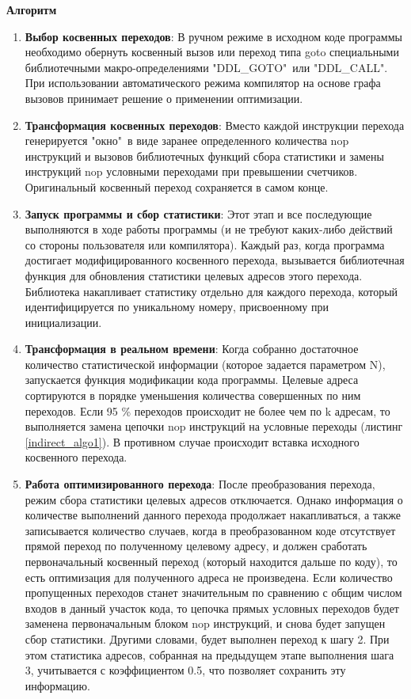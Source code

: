 \textbf{Алгоритм}
 \begin{enumerate}
 	\item \textbf{Выбор косвенных переходов}: В ручном режиме в исходном коде программы  необходимо обернуть косвенный вызов или переход типа goto специальными библиотечными макро-определениями "DDL\_GOTO"\  или "DDL\_CALL". При использовании автоматического режима компилятор на основе графа вызовов принимает решение о применении оптимизации. 
 	\item \textbf{Трансформация косвенных переходов}: Вместо каждой инструкции перехода генерируется "окно"\  в виде заранее определенного количества nop инструкций и вызовов библиотечных функций сбора статистики и замены инструкций nop условными переходами при превышении счетчиков. Оригинальный косвенный переход сохраняется в самом конце.
 	\item \textbf{Запуск программы и сбор статистики}: Этот этап и все последующие  выполняются в ходе работы программы (и не требуют каких-либо действий со стороны пользователя или компилятора). Каждый раз, когда программа достигает модифицированного косвенного перехода, вызывается библиотечная функция для обновления статистики целевых адресов этого перехода. Библиотека  накапливает статистику отдельно для каждого перехода, который идентифицируется по уникальному номеру, присвоенному при инициализации.
 	\item \textbf{Трансформация в реальном времени}: Когда собранно достаточное количество статистической информации (которое задается параметром N), запускается функция модификации кода программы. Целевые адреса сортируются в порядке уменьшения количества совершенных по ним переходов. Если 95 \% переходов происходит не более чем по k адресам, то выполняется замена цепочки nop инструкций на условные переходы (листинг \ref{indirect_algo1}). В противном случае происходит вставка исходного косвенного перехода.
	\item \textbf{Работа оптимизированного перехода}: После преобразования перехода, режим сбора статистики целевых адресов отключается. Однако информация о количестве выполнений данного перехода продолжает накапливаться, а также записывается количество случаев, когда в преобразованном коде отсутствует прямой переход по полученному целевому адресу, и должен сработать первоначальный косвенный переход (который находится дальше по коду), то есть оптимизация для полученного адреса не произведена. Если количество пропущенных переходов станет значительным по сравнению с общим числом входов в данный участок кода, то цепочка прямых условных переходов будет заменена первоначальным блоком nop инструкций, и снова будет запущен сбор статистики. Другими словами, будет выполнен переход к шагу 2. При этом статистика адресов, собранная на предыдущем этапе выполнения шага 3, учитывается с коэффициентом 0.5, что позволяет сохранить эту информацию.
 \end{enumerate}

